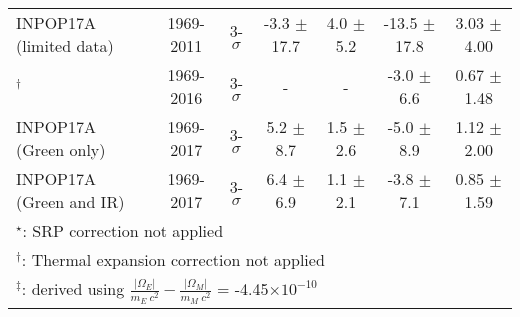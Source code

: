 \documentclass[fleqn,usenatbib,referee]{mnras}
\begin{document}
\begin{table*}
\begin{tabular}{lcccccc}
INPOP17A (limited data)	             &1969-2011 		       & 3-$\sigma$		                  & -3.3 $\pm$ 17.7 				                         & 4.0 $\pm$ 5.2 						& -13.5 $\pm$ 17.8                          & 3.03 $\pm$ 4.00                         \\
\cite{Hofmann2016}$^\dag$		&1969-2016 		       & 3-$\sigma$		                  & - 							                               & - 									& -3.0 $\pm$ 6.6                              & 0.67 $\pm$ 1.48                         \\
INPOP17A (Green only)	             &1969-2017 		       & 3-$\sigma$		                  & 5.2 $\pm$ 8.7 				                         & 1.5 $\pm$ 2.6 						& -5.0 $\pm$ 8.9                              & 1.12 $\pm$ 2.00                        \\
INPOP17A (Green and IR)            &1969-2017		       & 3-$\sigma$		                  & 6.4 $\pm$ 6.9 				                         & 1.1 $\pm$ 2.1 						& -3.8 $\pm$ 7.1                              & 0.85 $\pm$ 1.59                        \\ \bottomrule
\multicolumn{7}{l}{$^\star$: SRP correction not applied} \\
\multicolumn{7}{l}{$^\dag$: Thermal expansion correction not applied}\\
\multicolumn{7}{l}{$^\ddag$: derived using $\frac{|\Omega_E|}{m_E~c^2} - \frac{|\Omega_M|}{m_M~c^2}$ = -4.45$\times10^{-10}$ \protect\cite[Eqn. 6]{Williams2012}}

\end{tabular}
 \end{table*}
\end{document}
